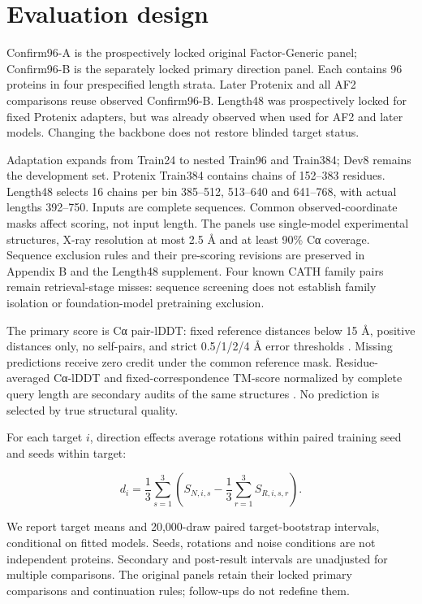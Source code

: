 \section{Evaluation design}
\label{sec:3}
Confirm96-A is the prospectively locked original Factor-Generic panel;
Confirm96-B is the separately locked primary direction panel. Each contains
96 proteins in four prespecified length strata. Later Protenix and all AF2
comparisons reuse observed Confirm96-B. Length48 was prospectively locked for
fixed Protenix adapters, but was already observed when used for AF2 and later
models. Changing the backbone does not restore blinded target status.

Adaptation expands from Train24 to nested Train96 and Train384; Dev8 remains
the development set. Protenix Train384 contains chains of 152--383 residues.
Length48 selects 16 chains per bin 385--512, 513--640 and 641--768, with actual
lengths 392--750. Inputs are complete sequences. Common observed-coordinate
masks affect scoring, not input length. The panels use single-model experimental
structures, X-ray resolution at most 2.5 Å and at least 90\% Cα coverage.
Sequence exclusion rules and their pre-scoring revisions are preserved in
Appendix B and the Length48 supplement. Four known CATH family pairs remain
retrieval-stage misses: sequence screening does not establish family isolation
or foundation-model pretraining exclusion.

The primary score is Cα pair-lDDT: fixed reference distances below 15 Å,
positive distances only, no self-pairs, and strict 0.5/1/2/4 Å error thresholds
\citep{alphafold_code,openstructure,lddt}. Missing predictions receive zero credit under the common reference
mask. Residue-averaged Cα-lDDT and fixed-correspondence TM-score normalized by
complete query length are secondary audits of the same structures \citep{usalign}.
No prediction is selected by true structural quality.

For each target \(i\), direction effects average rotations within paired training
seed and seeds within target:

\[
d_i=\frac13\sum_{s=1}^3\left(S_{N,i,s}-\frac13\sum_{r=1}^3S_{R,i,s,r}\right).
\tag{3}
\]

We report target means and 20,000-draw paired target-bootstrap intervals,
conditional on fitted models. Seeds, rotations and noise conditions are not
independent proteins. Secondary and post-result intervals are unadjusted for
multiple comparisons. The original panels retain their locked primary
comparisons and continuation rules; follow-ups do not redefine them.


